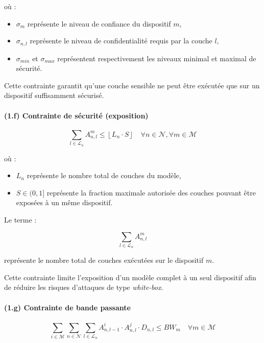 \documentclass[12pt,a4paper]{report}
\begin{document}
où :
\begin{itemize}
    \item $\sigma_m$ représente le niveau de confiance du dispositif $m$,
    \item $\sigma_{n,l}$ représente le niveau de confidentialité requis par la couche $l$,
    \item $\sigma_{min}$ et $\sigma_{max}$ représentent respectivement les niveaux minimal et maximal de sécurité.
\end{itemize}

Cette contrainte garantit qu’une couche sensible ne peut être exécutée que sur un dispositif suffisamment sécurisé.

\paragraph{(1.f) Contrainte de sécurité (exposition)}

\begin{equation}
\sum_{l \in \mathcal{L}_n} A_{n,l}^m
\leq
\left\lfloor L_n \cdot S \right\rfloor
\quad \forall n \in \mathcal{N}, \forall m \in \mathcal{M}
\end{equation}

où :
\begin{itemize}
    \item $L_n$ représente le nombre total de couches du modèle,
    \item $S \in (0,1]$ représente la fraction maximale autorisée des couches pouvant être exposées à un même dispositif.
\end{itemize}

Le terme :

\begin{equation}
\sum_{l \in \mathcal{L}_n} A_{n,l}^m
\end{equation}

représente le nombre total de couches exécutées sur le dispositif $m$.

Cette contrainte limite l’exposition d’un modèle complet à un seul dispositif afin de réduire les risques d’attaques de type \textit{white-box}.

\paragraph{(1.g) Contrainte de bande passante}

\begin{equation}
\sum_{i \in \mathcal{M}}
\sum_{n \in \mathcal{N}}
\sum_{l \in \mathcal{L}_n}
A_{n,l-1}^{i} \cdot A_{n,l}^{j} \cdot D_{n,l}
\leq BW_m
\quad \forall m \in \mathcal{M}
\end{equation}
\end{document}
